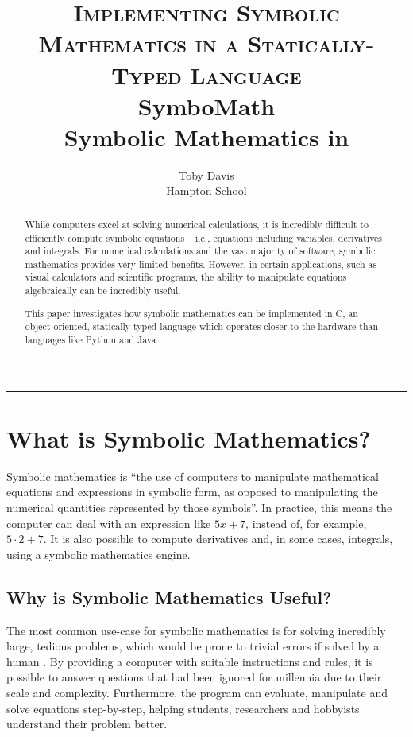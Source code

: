 \documentclass[12pt]{article}
\title{
\textsc{Implementing Symbolic Mathematics in a Statically-Typed Language}\\[2.2cm]


{\LARGE \bfseries
SymboMath}\\
{\Large\bfseries
Symbolic Mathematics in \CC}
}
\author{Toby Davis\\[0.2cm]Hampton School}
\def\CC{{C\nolinebreak[4]\hspace{-.05em}\raisebox{.4ex}{\tiny\bf ++ }}}
\begin{document}
\maketitle
\thispagestyle{empty}
\vspace{0.5cm}
\hrule
\vspace{1cm}
\begin{abstract} %
While computers excel at solving numerical calculations, it is incredibly difficult to efficiently compute symbolic equations -- i.e., equations including variables, derivatives and integrals. For numerical calculations and the vast majority of software, symbolic mathematics provides very limited benefits. However, in certain applications, such as visual calculators and scientific programs, the ability to manipulate equations algebraically can be incredibly useful.

This paper investigates how symbolic mathematics can be implemented in \CC, an object-oriented, statically-typed language which operates closer to the hardware than languages like Python and Java.
\end{abstract}

\vfill
\newpage

{
  \hypersetup{linkcolor=black}
  \tableofcontents
}

\pagebreak

\section{What is Symbolic Mathematics?} \label{whatisit}

Symbolic mathematics is ``the use of computers to manipulate mathematical equations and expressions in symbolic form, as opposed to manipulating the numerical quantities represented by those symbols''\cite{symbolicdefinition}.  In practice, this means the computer can deal with an expression like $5x+7$, instead of, for example, $5 \cdot 2 + 7$. It is also possible to compute derivatives and, in some cases, integrals, using a symbolic mathematics engine.
 
\subsection{Why is Symbolic Mathematics Useful?} \label{whyuseful}

The most common use-case for  symbolic mathematics is for solving incredibly large, tedious problems, which would be prone to trivial errors if solved by a human \cite{computeraidformathematics}. By providing a computer with suitable instructions and rules, it is possible to answer questions that had been ignored for millennia due to their scale and complexity. Furthermore, the program can evaluate, manipulate and solve equations step-by-step, helping students, researchers and hobbyists understand their problem better.
\end{document}
